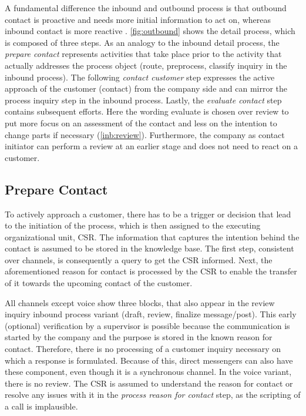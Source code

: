 		
		
		
		A fundamental difference the inbound and outbound process is that outbound contact is proactive and needs more initial information to act on, whereas inbound contact is more reactive \citep{DimensionData2015}. \Fig \ref{fig:outbound} shows the detail process, which is composed of three steps. As an analogy to the inbound detail process, the \textit{prepare contact} represents activities that take place prior to the activity that actually addresses the process object (route, preprocess, classify inquiry in the inbound process). The following \textit{contact customer} step expresses the active approach of the customer (contact) from the company side and can mirror the process inquiry step in the inbound process. Lastly, the \textit{evaluate contact} step contains subsequent efforts. Here the wording evaluate is chosen over review to put more focus on an assessment of the contact and less on the intention to change parts if necessary (\cf \ref{inb:review}). Furthermore, the company as contact initiator can perform a review at an earlier stage and does not need to react on a customer. 
		

		\subsection{Prepare Contact}
		
		To actively approach a customer, there has to be a trigger or decision that lead to the initiation of the process, which is then assigned to the executing organizational unit, \ie \acrshort{CSR}. The information that captures the intention behind the contact is assumed to be stored in the knowledge base. The first step, consistent over channels, is consequently a query to get the \acrshort{CSR} informed. Next, the aforementioned reason for contact is processed by the \acrshort{CSR} to enable the transfer of it towards the upcoming contact of the customer. 
		
		All channels except voice show three blocks, that also appear in the review inquiry inbound process variant (draft, review, finalize message/post). This early (optional) verification by a supervisor is possible because the communication is started by the company and the purpose is stored in the known reason for contact. Therefore, there is no processing of a customer inquiry necessary on which a response is formulated. Because of this, direct messengers can also have these component, even though it is a synchronous channel. In the voice variant, there is no review. The \acrshort{CSR} is assumed to understand the reason for contact or resolve any issues with it in the \textit{process reason for contact} step, as the scripting of a call is implausible. 
		
